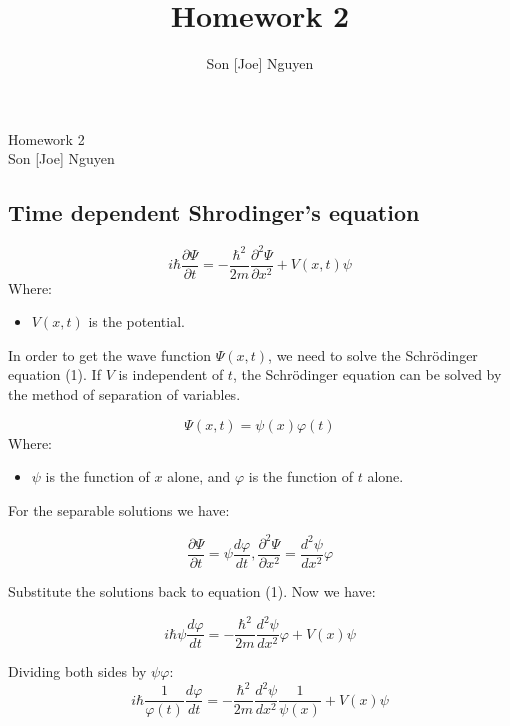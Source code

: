 \documentclass{article}
\title{Homework 2}
\author{Son [Joe] Nguyen}
\begin{document}
\begin{center}
    \LARGE{Homework 2}\\[1em]
    \large Son [Joe] Nguyen\\[1em]
\end{center}

\subsection*{Time dependent Shrodinger's equation}

\begin{equation}
    i\hbar \frac{\partial \Psi}{\partial t} = -\frac{\hbar^2}{2m} \frac{\partial^2\Psi}{\partial x^2} + V(x,t)\psi
\end{equation}
Where:
\begin{itemize}
    \item \(V(x,t)\) is the potential.
\end{itemize}

\noindent In order to get the wave function \(\Psi(x,t)\), we need to solve the Schrödinger equation (1).
If \(V\) is independent of \(t\), the Schrödinger equation can be solved by the method of separation of variables.

\begin{equation}
    \Psi(x,t) = \psi(x) \varphi(t)
\end{equation}
Where:
    \begin{itemize}
        \item \(\psi\) is the function of \(x\) alone, and \(\varphi\) is the function of \(t\) alone.
    \end{itemize}

For the separable solutions we have:

\[\frac{\partial \Psi}{\partial t} = \psi \frac{d\varphi}{dt}, \frac{\partial^2 \Psi}{\partial x^2}=\frac{d^2 \psi}{dx^2}\varphi\] 

Substitute the solutions back to equation (1). Now we have: 

\begin{equation}
    i\hbar \psi \frac{d\varphi}{dt} = -\frac{\hbar^2}{2m} \frac{d^2 \psi}{dx^2}\varphi + V(x)\psi
\end{equation}

Dividing both sides by \(\psi \varphi\):
\begin{equation}
    i\hbar \frac{1}{\varphi(t)} \frac{d\varphi}{dt} = -\frac{\hbar^2}{2m} \frac{d^2 \psi}{dx^2} \frac{1}{\psi(x)} + V(x)\psi
\end{equation}
\end{document}

